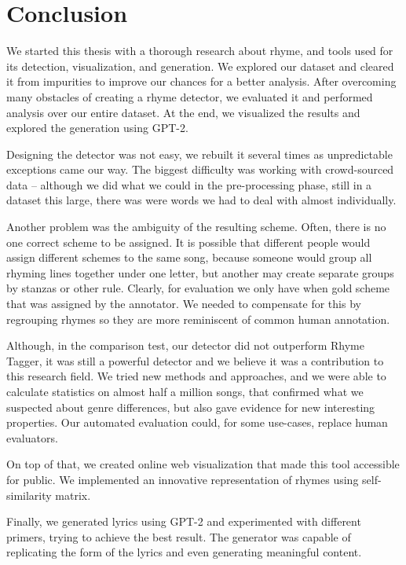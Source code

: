 \chapter*{Conclusion}
We started this thesis with a thorough research about rhyme, and tools used for its detection, visualization, and generation. We explored our dataset and cleared it from impurities to improve our chances for a better analysis. After overcoming many obstacles of creating a rhyme detector, we evaluated it and performed analysis over our entire dataset. At the end, we visualized the results and explored the generation using GPT-2.

Designing the detector was not easy, we rebuilt it several times as unpredictable exceptions came our way. The biggest difficulty was working with crowd-sourced data -- although we did what we could in the pre-processing phase, still in a dataset this large, there was were words we had to deal with almost individually.

Another problem was the ambiguity of the resulting scheme. Often, there is no one correct scheme to be assigned. It is possible that different people would assign different schemes to the same song, because someone would group all rhyming lines together under one letter, but another may create separate groups by stanzas or other rule. Clearly, for evaluation we only have when gold scheme that was assigned by the annotator. We needed to compensate for this by regrouping rhymes so they are more reminiscent of common human annotation.

Although, in the comparison test, our detector did not outperform Rhyme Tagger, it was still a powerful detector and we believe it was a contribution to this research field. We tried new methods and approaches, and we were able to calculate statistics on almost half a million songs, that confirmed what we suspected about genre differences, but also gave evidence for new interesting properties. Our automated evaluation could, for some use-cases, replace human evaluators.

On top of that, we created online web visualization that made this tool accessible for public. We implemented an innovative representation of rhymes using self-similarity matrix.

Finally, we generated lyrics using GPT-2 and experimented with different primers, trying to achieve the best result. The generator was capable of replicating the form of the lyrics and even generating meaningful content. 

